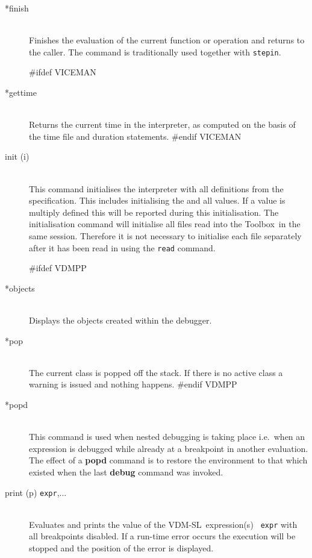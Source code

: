 \documentclass[\pformat,12pt]{article}
\newcommand{\vdmslpp}{VDM-SL}
\newcommand{\Toolbox}{Toolbox}
\newcommand{\vdmslpp}{VDM++}
\newcommand{\Toolbox}{Toolbox}
\begin{document}
\begin{description}
\item[*finish]\mbox{}\\
  Finishes the evaluation of the current function or
  operation and returns to the
  caller. The command is traditionally used together with {\tt stepin}.

#ifdef VICEMAN
\item[*gettime]\mbox{}\\
  Returns the current time in the interpreter, as computed 
  on the basis of the time file and duration statements.
#endif VICEMAN

\item[init (i)] \mbox{}\\ This command initialises
  the interpreter with all definitions from the specification. This
  includes initialising the
   and all
  values. If a value is multiply defined this will be reported during
  this initialisation. The initialisation command will initialise all
  files read into the \Toolbox\ in the same session. Therefore it is
  not necessary to initialise each file separately after it has been
  read in using the {\tt read} command.

#ifdef VDMPP
\item[*objects] \mbox{}\\
  Displays the objects created within the debugger.
  
\item[*pop] \mbox{}\\
  The current class is popped off the stack. 
If there is no active class a warning is issued and
  nothing happens.
#endif VDMPP

\item[*popd] \mbox{}\\
  This command is used when nested debugging is taking place i.e.\ when
  an expression is debugged while already at a breakpoint in another
  evaluation. The effect of a
  \textbf{popd} command is to restore the environment to that which
  existed when the last \textbf{debug} command was invoked.
 
\item[print (p) {\tt expr},...] \mbox{}\\
  Evaluates and prints the value of the \vdmslpp\ expression(s) {\tt
    expr} with all breakpoints disabled. If a run-time error occurs
  the execution will be stopped and the position of the error is
  displayed.


\end{description}
\end{document}
